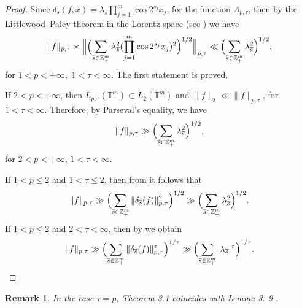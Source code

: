 \documentclass[12pt]{article}
\def\leq {\leqslant}
\theoremstyle{plain}
\newtheorem{rem}{Remark}[section]
\begin{document}
\begin{proof}
Since $\delta_{\overline{s}}(f, \overline{x}) = \lambda_{\overline{s}} \prod_{j=1}^{m}\cos 2^{s_{j}}x_{j}$, for the function $\Lambda_{p ,\tau}$, then by the Littlewood--Paley theorem in the Lorentz space (see \cite[Theorem 1.1]{25}) we have
\begin{equation*}
\|f\|_{p, \tau} \asymp \Bigl\|\Bigl(\sum_{\overline{s} \in \mathbb{Z}_{+}^{m}}\lambda_{\overline{s}}^{2}(\prod_{j=1}^{m}\cos 2^{s_{j}}x_{j})^{2} \Bigr)^{1/2}\Bigr\|_{p, \tau}\ll \Bigl(\sum_{\overline{s} \in \mathbb{Z}_{+}^{m}}\lambda_{\overline{s}}^{2}\Bigr)^{1/2},
\end{equation*}
for  $1 < p < +\infty,$ $1< \tau< \infty$. The first statement is proved.

If $2< p< +\infty$, then $L_{p, \tau}(\mathbb{T}^{m}) \subset L_{2}(\mathbb{T}^{m})$ and $\|f\|_{2}\ll \|f\|_{p, \tau}$, for $1< \tau< \infty$. Therefore, by Parseval's equality, we have
\begin{equation*}
\|f\|_{p, \tau}\gg \Bigl(\sum_{\overline{s} \in \mathbb{Z}_{+}^{m}}\lambda_{\overline{s}}^{2}\Bigr)^{1/2},
\end{equation*}
for  $2< p< +\infty$, $1< \tau< \infty$.

If $1 < p \leq 2$ and $1< \tau \leq 2$, then from \cite[Lemma 1.5 and Lemma 1.6]{4} it follows that
\begin{equation*}
\|f\|_{p, \tau} \gg \Bigl(\sum\limits_{\overline{s} \in \mathbb{Z}_{+}^{m}}\|\delta_{\overline{s}}(f)\|_{p, \tau}^{2}\Bigr)^{1/2} \gg \Bigl(\sum_{\overline{s} \in \mathbb{Z}_{+}^{m}}\lambda_{\overline{s}}^{2}\Bigr)^{1/2}.
\end{equation*}
If $1 < p \leq 2$ and $2< \tau < \infty$, then by \cite[Lemma 1.5 and Lemma 1.6]{4} we obtain
\begin{equation*}
\|f\|_{p, \tau} \gg \Bigl(\sum\limits_{\overline{s} \in \mathbb{Z}_{+}^{m}}\|\delta_{\overline{s}}(f)\|_{p, \tau}^{\tau}\Bigr)^{1/\tau} \gg \Bigl(\sum_{\overline{s} \in \mathbb{Z}_{+}^{m}}|\lambda_{\overline{s}}|^{\tau}\Bigr)^{1/\tau}.
\end{equation*}
\end{proof}

\begin{rem}\label{rem3.2}
In the case $\tau = p$, Theorem 3.1 coincides with Lemma 3. 9 \cite{17}.
\end{rem}
 
\end{document}
